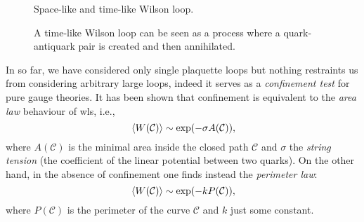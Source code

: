 \begin{figure}[t]
    \begin{minipage}[t]{0.48\textwidth}
        \centering
        \parbox[t][6cm][c]{\textwidth}{\centering}
        \caption{Space-like and time-like Wilson loop.}
    \end{minipage}
    \hfill
    \begin{minipage}[t]{0.48\textwidth}
        \parbox[t][6cm][c]{\textwidth}{\centering}
        \caption[Quark-antiquark pair]{A time-like Wilson loop can be seen as a process where a quark-antiquark pair is created and then annihilated.}
    \end{minipage}
\end{figure}

In so far, we have considered only single plaquette loops but nothing restraints us from considering arbitrary large loops, indeed it serves as a \emph{confinement test} for pure gauge theories.
It has been shown \cite{wilson1974confinement} that confinement is equivalent to the \emph{area law} behaviour of \ac{wl}s, i.e.,
\begin{equation}
    \ev*{W(\mathcal{C})} \sim \exp(- \sigma A(\mathcal{C})),
    \label{eq:wilson_area_law}
\end{equation}
where $A(\mathcal{C})$ is the minimal area inside the closed path $\mathcal{C}$ and $\sigma$ the \emph{string tension} (the coefficient of the linear potential between two quarks).
On the other hand, in the absence of confinement one finds instead the \emph{perimeter law}:
\begin{equation}
    \ev*{W(\mathcal{C})} \sim \exp(- k P(\mathcal{C})),
    \label{eq:wilson_perimeter_law}
\end{equation}
where $P(\mathcal{C})$ is the perimeter of the curve $\mathcal{C}$ and $k$ just some constant.


